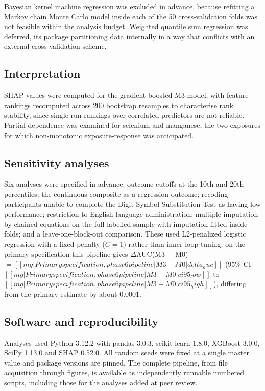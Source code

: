 \documentclass[12pt]{article}
\newcommand{\deltaauc}{$\Delta$AUC}
\begin{document}
Bayesian kernel machine regression was excluded in advance, because refitting a Markov chain Monte Carlo model inside each of the 50 cross-validation folds was not feasible within the analysis budget. Weighted quantile sum regression was deferred, its package partitioning data internally in a way that conflicts with an external cross-validation scheme.

\subsection*{Interpretation}

SHAP values were computed for the gradient-boosted M3 model, with feature rankings recomputed across 200 bootstrap resamples to characterise rank stability, since single-run rankings over correlated predictors are not reliable. Partial dependence was examined for selenium and manganese, the two exposures for which non-monotonic exposure-response was anticipated.

\subsection*{Sensitivity analyses}

Six analyses were specified in advance: outcome cutoffs at the 10th and 20th percentiles; the continuous composite as a regression outcome; recoding participants unable to complete the Digit Symbol Substitution Test as having low performance; restriction to English-language administration; multiple imputation by chained equations on the full labelled sample with imputation fitted inside folds; and a leave-one-block-out comparison. These used L2-penalized logistic regression with a fixed penalty ($C = 1$) rather than inner-loop tuning; on the primary specification this pipeline gives \deltaauc(M3 $-$ M0) $= [[mg|Primary specification, phase 6 pipeline|M3 - M0|delta_auc]]$ (95\% CI $[[mg|Primary specification, phase 6 pipeline|M3 - M0|ci95_low]]$ to $[[mg|Primary specification, phase 6 pipeline|M3 - M0|ci95_high]]$), differing from the primary estimate by about 0.0001.

\subsection*{Software and reproducibility}

Analyses used Python 3.12.2 with pandas 3.0.3, scikit-learn 1.8.0, XGBoost 3.0.0, SciPy 1.13.0 and SHAP 0.52.0. All random seeds were fixed at a single master value and package versions are pinned. The complete pipeline, from file acquisition through figures, is available as independently runnable numbered scripts, including those for the analyses added at peer review.
\end{document}
